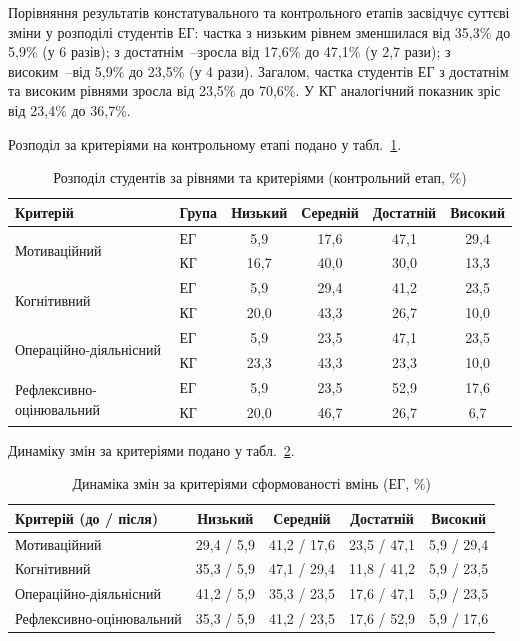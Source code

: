 Порівняння результатів констатувального та контрольного етапів засвідчує суттєві зміни у розподілі студентів ЕГ: частка з низьким рівнем зменшилася від 35,3\% до 5,9\% (у 6 разів); з достатнім~--зросла від 17,6\% до 47,1\% (у 2,7 рази); з високим~--від 5,9\% до 23,5\% (у 4 рази). Загалом, частка студентів ЕГ з достатнім та високим рівнями зросла від 23,5\% до 70,6\%. У КГ аналогічний показник зріс від 23,4\% до 36,7\%.

Розподіл за критеріями на контрольному етапі подано у табл.~\ref{tab:kontrol_detail}.

\begin{table}[!h]
\caption{Розподіл студентів за рівнями та критеріями (контрольний етап, \%)}
\label{tab:kontrol_detail}
\centering
\small
\begin{tabular}{|l|l|c|c|c|c|}
\hline
\textbf{Критерій} & \textbf{Група} & \textbf{Низький} & \textbf{Середній} & \textbf{Достатній} & \textbf{Високий} \\
\hline
\multirow{2}{*}{Мотиваційний} & ЕГ & 5,9 & 17,6 & 47,1 & 29,4 \\
\cline{2-6}
 & КГ & 16,7 & 40,0 & 30,0 & 13,3 \\
\hline
\multirow{2}{*}{Когнітивний} & ЕГ & 5,9 & 29,4 & 41,2 & 23,5 \\
\cline{2-6}
 & КГ & 20,0 & 43,3 & 26,7 & 10,0 \\
\hline
\multirow{2}{*}{Операційно-діяльнісний} & ЕГ & 5,9 & 23,5 & 47,1 & 23,5 \\
\cline{2-6}
 & КГ & 23,3 & 43,3 & 23,3 & 10,0 \\
\hline
\multirow{2}{*}{Рефлексивно-оцінювальний} & ЕГ & 5,9 & 23,5 & 52,9 & 17,6 \\
\cline{2-6}
 & КГ & 20,0 & 46,7 & 26,7 & 6,7 \\
\hline
\end{tabular}
\end{table}

Динаміку змін за критеріями подано у табл.~\ref{tab:dynamics}.

\begin{table}[!h]
\caption{Динаміка змін за критеріями сформованості вмінь (ЕГ, \%)}
\label{tab:dynamics}
\centering
\small
\begin{tabular}{|l|c|c|c|c|}
\hline
\textbf{Критерій (до / після)} & \textbf{Низький} & \textbf{Середній} & \textbf{Достатній} & \textbf{Високий} \\
\hline
Мотиваційний & 29,4 / 5,9 & 41,2 / 17,6 & 23,5 / 47,1 & 5,9 / 29,4 \\
\hline
Когнітивний & 35,3 / 5,9 & 47,1 / 29,4 & 11,8 / 41,2 & 5,9 / 23,5 \\
\hline
Операційно-діяльнісний & 41,2 / 5,9 & 35,3 / 23,5 & 17,6 / 47,1 & 5,9 / 23,5 \\
\hline
Рефлексивно-оцінювальний & 35,3 / 5,9 & 41,2 / 23,5 & 17,6 / 52,9 & 5,9 / 17,6 \\
\hline
\end{tabular}
\end{table}

